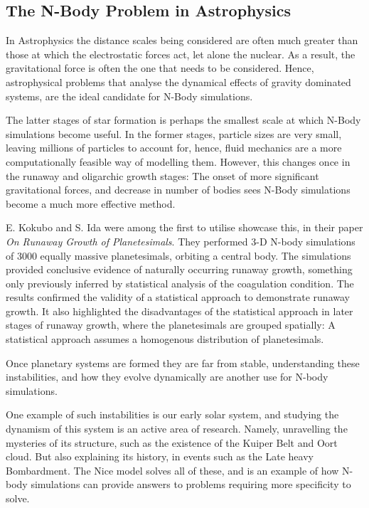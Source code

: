 \documentclass[a4paper,10pt]{article}
\begin{document}
\subsection{The N-Body Problem in Astrophysics}

In Astrophysics the distance scales being considered are often much greater than those at which the electrostatic forces act, let alone the nuclear. As a result, the gravitational force is often the one that needs to be considered. Hence, astrophysical problems that analyse the dynamical effects of gravity dominated systems, are the ideal candidate for N-Body simulations.

The latter stages of star formation is perhaps the smallest scale at which N-Body simulations become useful. In the former stages, particle sizes are very small, leaving millions of particles to account for, hence, fluid mechanics are a more computationally feasible way of modelling them. However, this changes once in the runaway and oligarchic growth stages: The onset of more significant gravitational forces, and decrease in number of bodies sees N-Body simulations become a much more effective method. 

E. Kokubo and S. Ida were among the first to utilise showcase this, in their paper \textit{On Runaway Growth of Planetesimals}\cite{Runaway}. They performed 3-D N-body simulations of 3000 equally massive planetesimals, orbiting a central body. The simulations provided conclusive evidence of naturally occurring runaway growth, something only previously inferred by statistical analysis of the coagulation condition\cite{Statistics,Coagulation}. The results confirmed the validity of a statistical approach to demonstrate runaway growth. It also highlighted the disadvantages of the statistical approach in later stages of runaway growth, where the planetesimals are grouped spatially: A statistical approach assumes a homogenous distribution of planetesimals.

Once planetary systems are formed they are far from stable, understanding these instabilities, and how they evolve dynamically are another use for N-body simulations. 

One example of such instabilities is our early solar system, and studying the dynamism of this system is an active area of research. Namely, unravelling the mysteries of its structure, such as the existence of the Kuiper Belt and Oort cloud. But also explaining its history, in events such as the Late heavy Bombardment. The Nice model solves all of these, and is an example of how N-body simulations can provide answers to problems requiring more specificity to solve. 
\end{document}
